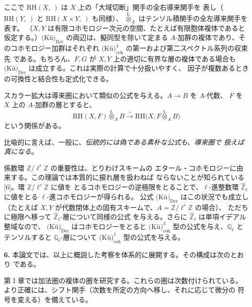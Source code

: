 \clearpage
{}
ここで $\mathrm{RH}(X,{\ })$ は $X$ 上の「大域切断」関手の全右導来関手を
表し（$\mathrm{RH}(Y,{\ })$ と $\mathrm{RH}(X\times Y,{\ })$ も同様）、
$\overset{\mathrm L}{\otimes}_A$ はテンソル積関手の全左導来関手を表す。
（$X,Y$ は有限コホモロジー次元の空間、たとえば有限胞体複体であると
仮定する。）$\text{(Kü)}_{\mathrm{Der}}$ の両辺は、擬同型を除いて定まる
$A$-加群の複体であり、そのコホモロジー加群はそれぞれ
$\text{(Kü)}_{\mathrm{coh}}^{4}$ の第一および第二スペクトル系列の収束先
である。もちろん、$F,G$ が $X,Y$ 上の適切に有界な層の複体である場合も
$\text{(Kü)}_{\mathrm{Der}}$ は成立する。これは実際の計算で十分扱いやすく、
因子が複数あるときの可換性と結合性も定式化できる。

スカラー拡大は導来圏において類似の公式を与える。$A\to B$ を $A$-代数、
$F$ を $X$ 上の $A$-加群の層とすると、
\[
\mathrm{RH}(X,F)\overset{\mathrm L}{\otimes}_A B
\xrightarrow{\sim}
\mathrm{RH}\bigl(X,F\overset{\mathrm L}{\otimes}_A B\bigr)
\]
という関係がある。

比喩的に言えば、一般に、\emph{伝統的には偽である素朴な公式も、導来圏で
扱えば真になる}。

係数環 $\mathbb Z/\ell^r\mathbb Z$ の重要性は、とりわけスキームの
エタール・コホモロジーに由来する。この理論では本質的に捩れ層を扱わねば
ならないことが知られている [6]。環 $\mathbb Z/\ell^r\mathbb Z$ に値を
とるコホモロジーの逆極限をとることで、$\ell$-進整数環
$\widehat{\mathbb Z}_{\ell}$ に値をとる $\ell$-進コホモロジーが得られる。
公式 $\text{(Kü)}_{\mathrm{Der}}$ はこの状況でも成立し（たとえば $X,Y$
が代数閉体上の固有スキームで、$A=\mathbb Z/\ell^r\mathbb Z$ の場合）、
ただちに極限へ移って $\widehat{\mathbb Z}_{\ell}$-層について同様の公式
を与える。さらに $\widehat{\mathbb Z}_{\ell}$ は単項イデアル整域なので、
$\text{(Kü)}_{\mathrm{Der}}$ はコホモロジーをとると
$\text{(Kü)}_{\mathrm{coh}}^{3}$ 型の公式を与え、$\mathbb Q_{\ell}$ と
テンソルすると $\mathbb Q_{\ell}$-層について
$\text{(Kü)}_{\mathrm{coh}}^{1}$ 型の公式を与える。

\noindent\textbf{6.}\quad
本論文では、以上に概説した考察を体系的に展開する。その構成は次のとおり
である。

第 I 章では加法圏の複体の圏を研究する。これらの圏は次数付けられている。
より正確には、シフト関手（次数を所定の方向へ移し、それに応じて微分の
符号を変える）を備えている。
